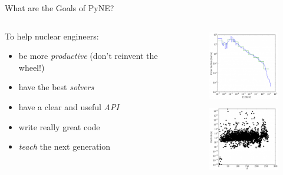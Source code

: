 \documentclass[xcolor=x11names,compress]{beamer}
\renewcommand{\(}{\begin{columns}}
\renewcommand{\)}{\end{columns}}
\newcommand{\<}[1]{\begin{column}{#1}}
\renewcommand{\>}{\end{column}}
\begin{document}
\begin{frame}{What are the Goals of PyNE?}

    \begin{columns}
    \begin{column}{0.4\textwidth}
        To help nuclear engineers:
        \begin{itemize}
        \item be more \textit{productive} (don't reinvent the wheel!)
        \item have the best \textit{solvers}
        \item have a clear and useful \textit{API}
        \item write really great code
        \item \textit{teach} the next generation
        \end{itemize}
  	\end{column}
 	\begin{column}{0.5\textwidth}
 	   \begin{center}
 	   \begin{figure}
 	   \includegraphics[height=1.25in,clip]{data_sources_thumb}  \\
       \includegraphics[height=1.25in,clip]{half_life_thumb}
	   \end{figure}
 	   \end{center}
  	\end{column}
	\end{columns}

\end{frame}
\end{document}
